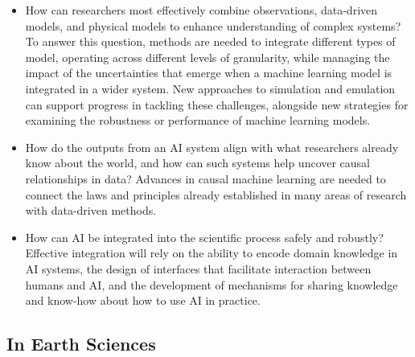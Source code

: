 \begin{itemize}
\item
  How can researchers most effectively combine observations, data-driven
  models, and physical models to enhance understanding of complex
  systems? To answer this question, methods are needed to integrate
  different types of model, operating across different levels of
  granularity, while managing the impact of the uncertainties that
  emerge when a machine learning model is integrated in a wider system.
  New approaches to simulation and emulation can support progress in
  tackling these challenges, alongside new strategies for examining the
  robustness or performance of machine learning models.
\item
  How do the outputs from an AI system align with what researchers
  already know about the world, and how can such systems help uncover
  causal relationships in data? Advances in causal machine learning are
  needed to connect the laws and principles already established in many
  areas of research with data-driven methods.
\item
  How can AI be integrated into the scientific process safely and
  robustly? Effective integration will rely on the ability to encode
  domain knowledge in AI systems, the design of interfaces that
  facilitate interaction between humans and AI, and the development of
  mechanisms for sharing knowledge and know-how about how to use AI in
  practice.
\end{itemize}

\hypertarget{in-earth-sciences}{%
\subsection{In Earth Sciences}\label{in-earth-sciences}}

